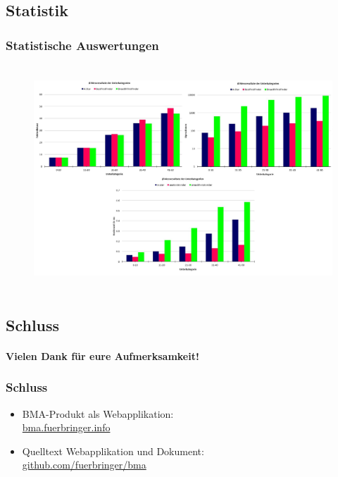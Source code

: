 \documentclass[professionalfont,serif,german]{beamer}
\begin{document}
\begin{frame}
  \section[Statistik]{Statistik}
  \frametitle{Statistische Auswertungen}
  \begin{columns}
    \begin{column}[T]{1.1\textwidth}
      \begin{figure}
        \includegraphics[height=7.75cm]{../thesis/images/statistik_all2.JPG}
      \end{figure}
    \end{column}
  \end{columns}
\end{frame}


\begin{frame}
  \section[Vielen Dank für eure Aufmerksamkeit!]{Schluss}
  \framesubtitle{Vielen Dank für eure Aufmerksamkeit!}
  \frametitle{Schluss}
  \begin{itemize}
    \item BMA-Produkt als Webapplikation:\\ \url{bma.fuerbringer.info}
    \item Quelltext Webapplikation und Dokument:\\
      \url{github.com/fuerbringer/bma}
  \end{itemize}
\end{frame}
\end{document}
